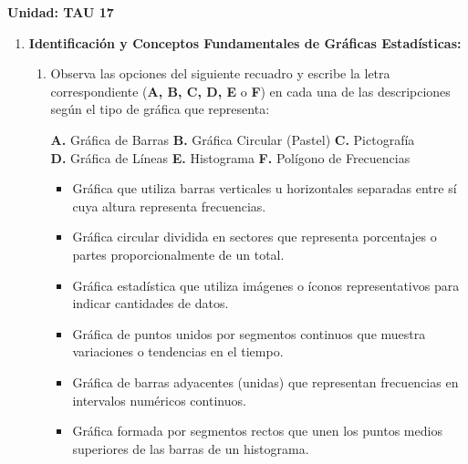 \documentclass[11pt, letterpaper]{article}
\begin{document}
	\begin{center}
		
		{\small \textbf{Unidad: TAU 17}}
	\end{center}

	
	
	\begin{enumerate}[leftmargin=*, itemsep=0.8cm]
		
		\item \textbf{Identificación y Conceptos Fundamentales de Gráficas Estadísticas:}
		\begin{enumerate}[label=\alph*), itemsep=0.25cm]
			\item Observa las opciones del siguiente recuadro y escribe la letra correspondiente (\textbf{A, B, C, D, E} o \textbf{F}) en cada una de las descripciones según el tipo de gráfica que representa:
			\begin{center}
				\begin{tcolorbox}[colback=valblue!10, colframe=valblue, arc=2mm, boxrule=0.8pt, width=0.95\textwidth]
					\centering \small
					\textbf{A.} Gráfica de Barras \quad \textbf{B.} Gráfica Circular (Pastel) \quad \textbf{C.} Pictografía \\
					\textbf{D.} Gráfica de Líneas \quad \textbf{E.} Histograma \quad \textbf{F.} Polígono de Frecuencias
				\end{tcolorbox}
			\end{center}
			\begin{itemize}[itemsep=0.15cm]
				\item [\textbf{[\quad]}] Gráfica que utiliza barras verticales u horizontales separadas entre sí cuya altura representa frecuencias.
				\item [\textbf{[\quad]}] Gráfica circular dividida en sectores que representa porcentajes o partes proporcionalmente de un total.
				\item [\textbf{[\quad]}] Gráfica estadística que utiliza imágenes o íconos representativos para indicar cantidades de datos.
				\item [\textbf{[\quad]}] Gráfica de puntos unidos por segmentos continuos que muestra variaciones o tendencias en el tiempo.
				\item [\textbf{[\quad]}] Gráfica de barras adyacentes (unidas) que representan frecuencias en intervalos numéricos continuos.
				\item [\textbf{[\quad]}] Gráfica formada por segmentos rectos que unen los puntos medios superiores de las barras de un histograma.
			\end{itemize}
			

\end{enumerate}
\end{enumerate}
\end{document}
